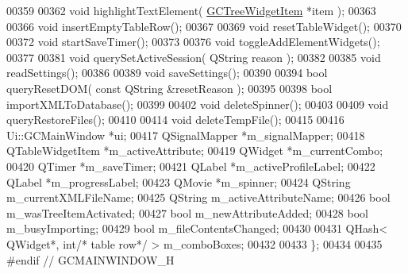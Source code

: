 \begin{DoxyCode}
00359 
00362   \textcolor{keywordtype}{void} highlightTextElement( \hyperlink{class_g_c_tree_widget_item}{GCTreeWidgetItem} *item );
00363 
00366   \textcolor{keywordtype}{void} insertEmptyTableRow();
00367 
00369   \textcolor{keywordtype}{void} resetTableWidget();
00370 
00372   \textcolor{keywordtype}{void} startSaveTimer();
00373 
00376   \textcolor{keywordtype}{void} toggleAddElementWidgets();
00377 
00381   \textcolor{keywordtype}{void} querySetActiveSession( QString reason );
00382 
00385   \textcolor{keywordtype}{void} readSettings();
00386 
00389   \textcolor{keywordtype}{void} saveSettings();
00390 
00394   \textcolor{keywordtype}{bool} queryResetDOM( \textcolor{keyword}{const} QString &resetReason );
00395 
00398   \textcolor{keywordtype}{bool} importXMLToDatabase();
00399 
00402   \textcolor{keywordtype}{void} deleteSpinner();
00403 
00409   \textcolor{keywordtype}{void} queryRestoreFiles();
00410 
00414   \textcolor{keywordtype}{void} deleteTempFile();
00415 
00416   Ui::GCMainWindow *ui;
00417   QSignalMapper    *m\_signalMapper;
00418   QTableWidgetItem *m\_activeAttribute;
00419   QWidget          *m\_currentCombo;
00420   QTimer           *m\_saveTimer;
00421   QLabel           *m\_activeProfileLabel;
00422   QLabel           *m\_progressLabel;
00423   QMovie           *m\_spinner;
00424   QString           m\_currentXMLFileName;
00425   QString           m\_activeAttributeName;
00426   \textcolor{keywordtype}{bool}              m\_wasTreeItemActivated;
00427   \textcolor{keywordtype}{bool}              m\_newAttributeAdded;
00428   \textcolor{keywordtype}{bool}              m\_busyImporting;
00429   \textcolor{keywordtype}{bool}              m\_fileContentsChanged;
00430 
00431   QHash< QWidget*, \textcolor{keywordtype}{int}\textcolor{comment}{/* table row*/} > m\_comboBoxes;
00432 
00433 \};
00434 
00435 \textcolor{preprocessor}{#endif // GCMAINWINDOW\_H}
\end{DoxyCode}
